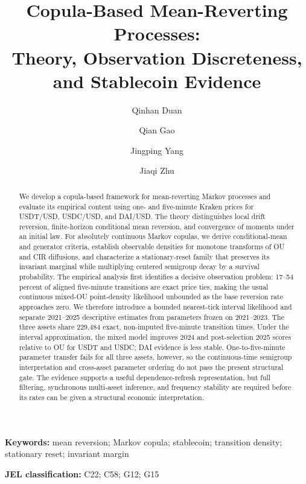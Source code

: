 \documentclass[11pt]{article}
\title{Copula-Based Mean-Reverting Processes:\\
Theory, Observation Discreteness, and Stablecoin Evidence}
\author{Qinhan Duan \and Qian Gao \and Jingping Yang \and Jiaqi Zhu}
\date{}
\theoremstyle{remark}
\newcommand{\1}{\mathbf 1}
\begin{document}
\maketitle

\begin{abstract}
We develop a copula-based framework for mean-reverting Markov processes and
evaluate its empirical content using one- and five-minute Kraken prices for
USDT/USD, USDC/USD, and DAI/USD.
The theory distinguishes local drift reversion, finite-horizon conditional
mean reversion, and convergence of moments under an initial law.  For
absolutely continuous Markov copulas, we derive conditional-mean and generator
criteria, establish observable densities for monotone transforms of OU and CIR
diffusions, and characterize a stationary-reset family that preserves its
invariant marginal while multiplying centered semigroup decay by a survival
probability.  The empirical analysis first identifies a decisive observation
problem: 17--54 percent of aligned five-minute transitions are exact price
ties, making the usual continuous mixed-OU point-density likelihood unbounded
as the base reversion rate approaches zero.  We therefore introduce a bounded
nearest-tick interval likelihood and separate 2021--2025 descriptive estimates
from parameters frozen on 2021--2023.  The three assets share 229,484 exact,
non-imputed five-minute transition times.  Under the interval approximation,
the mixed model improves 2024 and post-selection 2025 scores relative to OU
for USDT and USDC; DAI evidence is less stable.  One-to-five-minute parameter
transfer fails for all three assets, however, so the continuous-time semigroup
interpretation and cross-asset parameter ordering do not pass the present
structural gate.  The evidence supports a useful dependence-refresh
representation, but full filtering, synchronous multi-asset inference, and
frequency stability are required before its rates can be given a structural
economic interpretation.
\end{abstract}

\noindent\textbf{Keywords:} mean reversion; Markov copula; stablecoin; transition density; stationary reset; invariant margin

\medskip
\noindent\textbf{JEL classification:} C22; C58; G12; G15






\appendix



\clearpage


\end{document}
